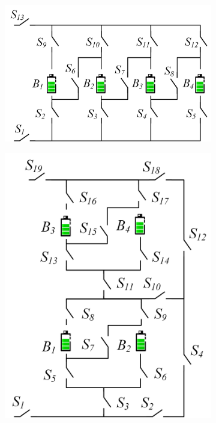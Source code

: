 \documentclass{article}
\begin{document}
\begin{figure}[htbp]
\begin{subfigure}[b]{0.2\textwidth}
        \caption{}
        \label{fig:study-stru-Lawson}
    \end{subfigure}
    \hspace{0.02\textwidth}
    \begin{subfigure}[b]{0.4\textwidth}
        \includegraphics[width=\textwidth]{stru-V-origin.png}
        \caption{}
        \label{fig:study-stru-Visairo}
    \end{subfigure}
    \hspace{0.02\textwidth}
    \begin{subfigure}[b]{0.31\textwidth}
        \includegraphics[width=\textwidth]{stru-my-origin.png}

\end{subfigure}
\end{figure}
\end{document}
